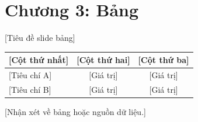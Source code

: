 \section{Chương 3: Bảng}

\begin{frame}{[Tiêu đề slide bảng]}
  \begin{table}
    \centering
    \small
    \renewcommand{\arraystretch}{1.5}
    \begin{tabular}{l c c}
      \toprule
      \textbf{[Cột thứ nhất]} & \textbf{[Cột thứ hai]} & \textbf{[Cột thứ ba]} \\
      \midrule
      {[Tiêu chí A]} & [Giá trị] & [Giá trị] \\
      {[Tiêu chí B]} & [Giá trị] & [Giá trị] \\
      \bottomrule
    \end{tabular}
  \end{table}
  \vspace{0.2cm}
  \centering
  {\small [Nhận xét về bảng hoặc nguồn dữ liệu.]}
\end{frame}

